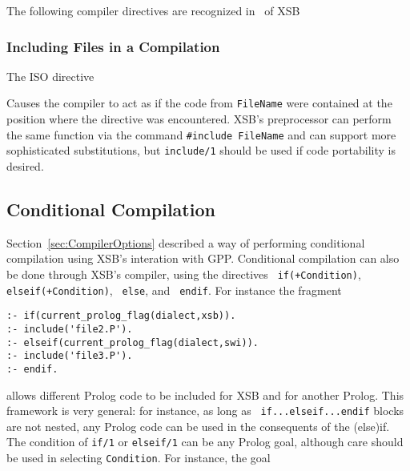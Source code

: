The following compiler directives are recognized in \version\ of XSB

\subsubsection{Including Files in a Compilation}

\begin{description}


The ISO directive 


\noindent

Causes the compiler to act as if the code from {\tt FileName} were
contained at the position where the directive was encountered.  XSB's
preprocessor can perform the same function via the command
\verb|#include FileName| and can support more sophisticated
substitutions, but {\tt include/1} should be used if code portability
is desired.

\end{description}

\subsection{Conditional Compilation}
%
Section~\ref{sec:CompilerOptions} described a way of performing
conditional compilation using XSB's interation with GPP.  Conditional
compilation can also be done through XSB's compiler, using the
directives {\tt \mif{} if(+Condition)}, {\tt \mif{}
  elseif(+Condition)}, {\tt \mif{} else}, and {\tt \mif{} endif}.  For
instance the fragment

\begin{verbatim}
:- if(current_prolog_flag(dialect,xsb)).
:- include('file2.P').
:- elseif(current_prolog_flag(dialect,swi)).
:- include('file3.P').
:- endif.
\end{verbatim}

allows different Prolog code to be included for XSB and for another
Prolog.  This framework is very general: for instance, as long as {\tt
  if...elseif...endif} blocks are not nested, any Prolog code can be
used in the consequents of the (else)if.  The condition of {\tt if/1}
or {\tt elseif/1} can be any Prolog goal, although care should be used
in selecting {\tt Condition}.  For instance, the goal

